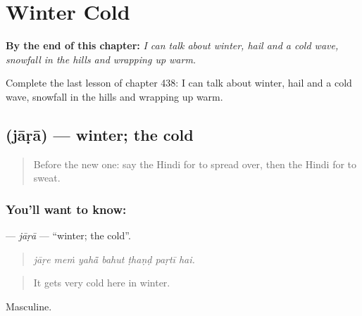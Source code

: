 
\chapter{Winter Cold}
\label{ch:hi-winter-cold}

\begin{chapteropening}
\textbf{By the end of this chapter:} \emph{I can talk about winter, hail and a cold wave, snowfall in the hills and wrapping up warm.}

Complete the last lesson of chapter 438: I can talk about winter, hail and a cold wave, snowfall in the hills and wrapping up warm.
\end{chapteropening}

\section[\texorpdfstring{\hi{जाड़ा} (jāṛā)}{जाड़ा (jāṛā)}]{ (jāṛā) — winter; the cold}

\label{lesson:HI-C438-jara}



\begin{quote}
Before the new one: say the Hindi for to spread over, then the Hindi for to sweat.
\end{quote}

\subsection*{You'll want to know: }
\textbf{} — \emph{jāṛā} — \textquotedblleft{}winter; the cold\textquotedblright{}.

\begin{quote}
      
\end{quote}

\begin{quote}
\emph{jāṛe meṁ yahā̃ bahut ṭhaṇḍ paṛtī hai.}
\end{quote}

\begin{quote}
It gets very cold here in winter.
\end{quote}

Masculine.


